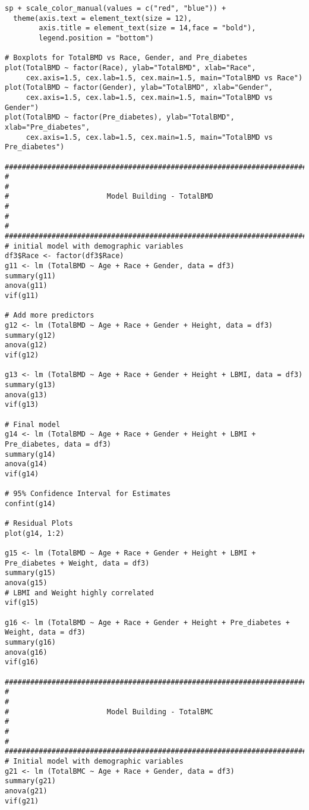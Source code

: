 \documentclass[11pt]{article}
\begin{document}
\begin{verbatim}
sp + scale_color_manual(values = c("red", "blue")) +
  theme(axis.text = element_text(size = 12),
        axis.title = element_text(size = 14,face = "bold"), 
        legend.position = "bottom") 

# Boxplots for TotalBMD vs Race, Gender, and Pre_diabetes
plot(TotalBMD ~ factor(Race), ylab="TotalBMD", xlab="Race",
     cex.axis=1.5, cex.lab=1.5, cex.main=1.5, main="TotalBMD vs Race")
plot(TotalBMD ~ factor(Gender), ylab="TotalBMD", xlab="Gender",
     cex.axis=1.5, cex.lab=1.5, cex.main=1.5, main="TotalBMD vs Gender")
plot(TotalBMD ~ factor(Pre_diabetes), ylab="TotalBMD", xlab="Pre_diabetes",
     cex.axis=1.5, cex.lab=1.5, cex.main=1.5, main="TotalBMD vs Pre_diabetes")

#######################################################################
#                                                                     #
#                       Model Building - TotalBMD                     #
#                                                                     #
#######################################################################
# initial model with demographic variables
df3$Race <- factor(df3$Race)
g11 <- lm (TotalBMD ~ Age + Race + Gender, data = df3)
summary(g11)
anova(g11)
vif(g11)

# Add more predictors
g12 <- lm (TotalBMD ~ Age + Race + Gender + Height, data = df3)
summary(g12)
anova(g12)
vif(g12)

g13 <- lm (TotalBMD ~ Age + Race + Gender + Height + LBMI, data = df3)
summary(g13)
anova(g13)
vif(g13)

# Final model
g14 <- lm (TotalBMD ~ Age + Race + Gender + Height + LBMI + Pre_diabetes, data = df3)
summary(g14)  
anova(g14)
vif(g14) 

# 95% Confidence Interval for Estimates
confint(g14)

# Residual Plots
plot(g14, 1:2)

g15 <- lm (TotalBMD ~ Age + Race + Gender + Height + LBMI + Pre_diabetes + Weight, data = df3)
summary(g15)
anova(g15)
# LBMI and Weight highly correlated
vif(g15) 

g16 <- lm (TotalBMD ~ Age + Race + Gender + Height + Pre_diabetes + Weight, data = df3)
summary(g16)
anova(g16)
vif(g16) 

#######################################################################
#                                                                     #
#                       Model Building - TotalBMC                     #
#                                                                     #
#######################################################################
# Initial model with demographic variables
g21 <- lm (TotalBMC ~ Age + Race + Gender, data = df3)
summary(g21)
anova(g21)
vif(g21)


\end{verbatim}
\end{document}
